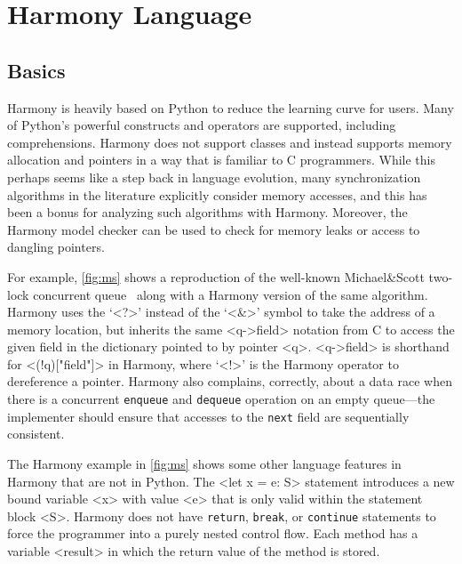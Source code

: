\documentclass[twocolumn]{article}
\begin{document}
\section{Harmony Language}

\subsection{Basics}

Harmony is heavily based on Python to reduce the learning curve for
users.  Many of Python's powerful constructs and operators are
supported, including comprehensions.  Harmony does
not support classes and instead supports memory allocation and
pointers in a way that is familiar to C programmers.  While this
perhaps seems like a step back in language evolution, many
synchronization algorithms in the literature explicitly consider
memory accesses, and this has been a bonus for
analyzing such algorithms with Harmony.  Moreover, the Harmony model
checker can be used to check for memory leaks or access to dangling
pointers.

For example, \autoref{fig:ms} shows a reproduction of the well-known
Michael\&Scott two-lock concurrent queue~\cite{MS96} along with a
Harmony version of the same algorithm.
Harmony uses the `<{?}>' instead of the `<{&}>' symbol to take the address
of a memory location, but inherits the same <{q->field}> notation
from C to access the given field in the dictionary pointed to by
pointer <{q}>.  <{q->field}> is shorthand for <{(!q)["field"]}> in
Harmony, where `<{!}>' is the Harmony operator to dereference a pointer.
Harmony also complains, correctly, about a data race when
there is a concurrent \texttt{enqueue} and \texttt{dequeue} operation
on an empty queue---the implementer should ensure that accesses to the
\texttt{next} field are sequentially consistent.

The Harmony example in \autoref{fig:ms} shows some other language
features in Harmony that are not in Python.
The <{let x = e: S}> statement introduces a new bound variable <{x}>
with value <{e}> that is only valid within the statement block <{S}>.
Harmony does not have \texttt{return}, \texttt{break}, or
\texttt{continue} statements to force the programmer into a purely
nested control flow.  Each method has a variable <{result}> in which
the return value of the method is stored.
\end{document}

